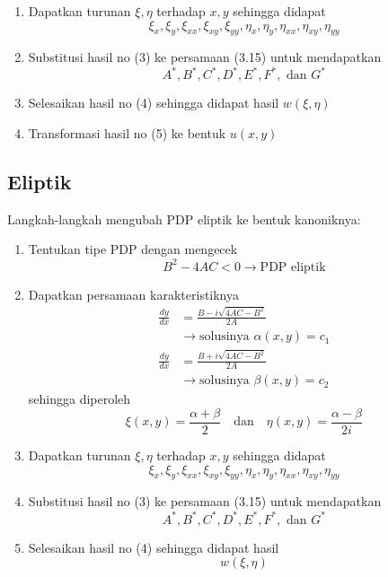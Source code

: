 \documentclass[a4paper,extrafontsizes, 9pt]{memoir}
\begin{document}
\begin{multicols}{3}
\begin{enumerate}
    \item Dapatkan turunan \( \xi, \eta \) terhadap \( x, y \) sehingga didapat
    \[
    \xi_x, \xi_y, \xi_{xx}, \xi_{xy}, \xi_{yy}, \eta_x, \eta_y, \eta_{xx}, \eta_{xy}, \eta_{yy}
    \]

    \item Substitusi hasil no (3) ke persamaan (3.15) untuk mendapatkan
    \[
    A^*, B^*, C^*, D^*, E^*, F^*, \text{ dan } G^*
    \]

    \item Selesaikan hasil no (4) sehingga didapat hasil
    $
    w(\xi, \eta)
    $

    \item Transformasi hasil no (5) ke bentuk
    $
    u(x, y)
    $
\end{enumerate}
\subsection*{\small Eliptik}
Langkah-langkah mengubah PDP eliptik ke bentuk kanoniknya:

\begin{enumerate}
    \item Tentukan tipe PDP dengan mengecek
    \[
    B^2 - 4AC < 0 \rightarrow \text{PDP eliptik}
    \]

    \item Dapatkan persamaan karakteristiknya
    \begin{align*}
        \frac{dy}{dx} &= \frac{B - i\sqrt{4AC - B^2}}{2A} \\ &\rightarrow \text{solusinya } \alpha(x,y) = c_1 \\
        \frac{dy}{dx} &= \frac{B + i\sqrt{4AC - B^2}}{2A} \\ &\rightarrow \text{solusinya } \beta(x,y) = c_2
    \end{align*}
    sehingga diperoleh 
    \[
    \xi(x,y) = \frac{\alpha + \beta}{2} \quad \text{dan} \quad \eta(x,y) = \frac{\alpha - \beta}{2i}
    \]

    \item Dapatkan turunan \( \xi, \eta \) terhadap \( x, y \) sehingga didapat
    \[
    \xi_x, \xi_y, \xi_{xx}, \xi_{xy}, \xi_{yy}, \eta_x, \eta_y, \eta_{xx}, \eta_{xy}, \eta_{yy}
    \]

    \item Substitusi hasil no (3) ke persamaan (3.15) untuk mendapatkan
    \[
    A^*, B^*, C^*, D^*, E^*, F^*, \text{ dan } G^*
    \]

    \item Selesaikan hasil no (4) sehingga didapat hasil
    \[
    w(\xi, \eta)
    \]


\end{enumerate}
\end{multicols}
\end{document}
